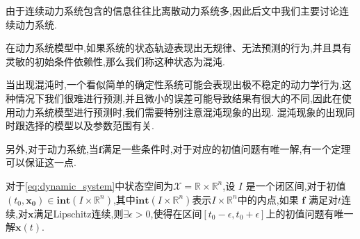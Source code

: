 由于连续动力系统包含的信息往往比离散动力系统多,因此后文中我们主要讨论连续动力系统. 

\begin{defn}[混沌]\cite{strogatz2018nonlinear}
    在动力系统模型中,如果系统的状态轨迹表现出无规律、无法预测的行为,并且具有灵敏的初始条件依赖性,那么我们称这种状态为混沌. 
\end{defn}

当出现混沌时,一个看似简单的确定性系统可能会表现出极不稳定的动力学行为,这种情况下我们很难进行预测,并且微小的误差可能导致结果有很大的不同,因此在使用动力系统模型进行预测时,我们需要特别注意混沌现象的出现. 混沌现象的出现同时跟选择的模型以及参数范围有关. 

另外,对于动力系统,当$\mathbf{f}$满足一些条件时,对于对应的初值问题有唯一解,有一个定理可以保证这一点. 

\begin{thm}\label{thm:picard_lindelof}
    对于\ref{eq:dynamic_system}中状态空间为$\mathcal{X}=\mathbb{R}\times\mathbb{R}^n$,设 \( I \) 是一个闭区间,对于初值$(t_0,\mathbf{x_0})\in \textbf{int} (I\times\mathbb{R}^n)$,其中$\textbf{int} (I\times\mathbb{R}^n)$表示$I\times\mathbb{R}^n$中的内点,如果 $\mathbf{f}$ 满足对$t$连续,对$\mathbf{x}$满足Lipschitz连续,则$\exists \epsilon>0$,使得在区间$[t_0-\epsilon,t_0+\epsilon]$上的初值问题有唯一解$\mathbf{x}(t)$. 
\end{thm}
